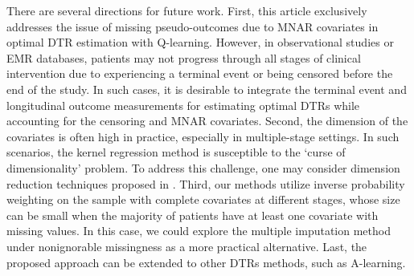 \documentclass[12pt]{article}
\begin{document}
There are several directions for future work. First, this article exclusively addresses the issue of missing pseudo-outcomes due to MNAR covariates in optimal DTR estimation with Q-learning. However, in observational studies or EMR databases, patients may not progress through all stages of clinical intervention due to experiencing a terminal event or being censored before the end of the study. In such cases, it is desirable to integrate the terminal event and longitudinal outcome measurements for estimating optimal DTRs while accounting for the censoring and MNAR covariates. Second, the dimension of the covariates is often high in practice, especially in multiple-stage settings. In such scenarios, the kernel regression method is susceptible to the `curse of dimensionality' problem. To address this challenge, one may consider dimension reduction techniques proposed in \cite{Tang_Zhao_Zhu_2014}. 
Third, our methods utilize inverse probability weighting on the  sample with complete covariates at different stages, whose size can be small  when the majority of patients have at least one covariate with missing values. %
In this case, we could explore the multiple imputation method under nonignorable missingness \citep{tompsett2018use} as a more practical alternative.  
Last, the proposed approach can be extended to other  DTRs methods, such as A-learning. 









\vspace{-8pt}
 

\end{document}
